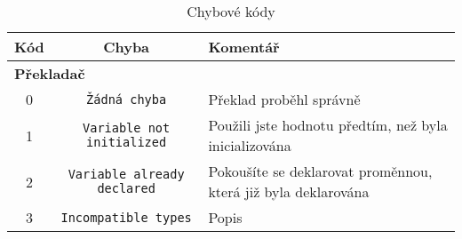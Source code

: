 \documentclass[
12pt,
a4paper,
pdftex,
czech
]{report}
\begin{document}
\begin{longtable}{|c|c|p{8cm}|}
\caption{Chybové kódy}
\label{chyby}
\endfirsthead
\endhead
\hline
		\textbf{Kód} & \textbf{Chyba} & \textbf{Komentář} \\
\hline\hline
\multicolumn{3}{|l|}{\textbf{Překladač}}\\ \hline
 \rule{0pt}{3ex}0 & \texttt{Žádná chyba} & Překlad proběhl správně \\ \hline
\rule{0pt}{3ex}1 & \texttt{Variable not initialized} & Použili jste hodnotu předtím, než byla inicializována \\ \hline
\rule{0pt}{3ex}2 & \texttt{Variable already declared} & Pokoušíte se deklarovat proměnnou, která již byla deklarována \\ \hline
\rule{0pt}{3ex}3 & \texttt{Incompatible types} & Popis \\ \hline
\end{longtable}
\end{document}
